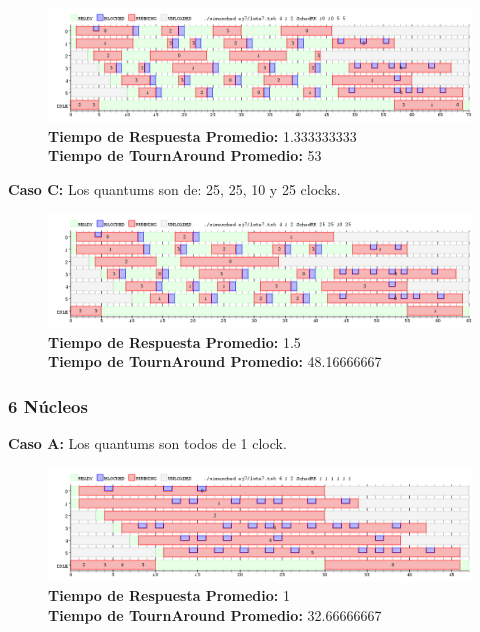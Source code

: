 \documentclass[a4paper]{article}
\begin{document}
			 \begin{figure}[h!]
   \begin{center}
 	\includegraphics[scale=0.5]{imagenes/ej7/4nucleoB.png}
 	\textbf{Tiempo de Respuesta Promedio:} 1.333333333 \\
 	\textbf{Tiempo de TournAround Promedio:} 53 \\
   \end{center}
 \end{figure} 
 
	\textbf{Caso C:}  Los quantums son de: 25, 25, 10 y 25 clocks.
	
			 \begin{figure}[h!]
   \begin{center}
 	\includegraphics[scale=0.5]{imagenes/ej7/4nucleoC.png}
 	\textbf{Tiempo de Respuesta Promedio:} 1.5 \\
 	\textbf{Tiempo de TournAround Promedio:} 48.16666667 \\
   \end{center}
 \end{figure} 
 
 \newpage
	\subsubsection*{6 N\'ucleos}
	
	\textbf{Caso A:}  Los quantums son todos de 1 clock.

		 \begin{figure}[h!]
   \begin{center}
 	\includegraphics[scale=0.5]{imagenes/ej7/6nucleoA.png}
 	\textbf{Tiempo de Respuesta Promedio:} 1 \\
 	\textbf{Tiempo de TournAround Promedio:} 32.66666667 \\
   \end{center}
 \end{figure} 
 	
\end{document}
